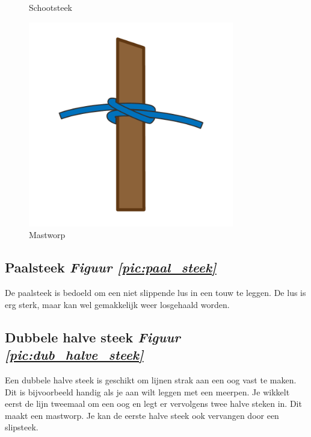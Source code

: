 \begin{figure}[h]
\begin{minipage}[b]{0.32\textwidth}
    \caption{Schootsteek}
    \label{pic:schoot_steek}
    \end{minipage}
  \hfill
  \begin{minipage}[b]{0.32\textwidth}
    \centering
    \includegraphics[width=0.8\textwidth]{Hoofdstukken/Schiemannen/pdf/mastworp.pdf}
    \caption{Mastworp}
    \label{pic:mastworp}
  \end{minipage}
\end{figure}
\subsection{Paalsteek \hfill \textit{Figuur \ref{pic:paal_steek}}} 
De paalsteek is bedoeld om een niet slippende lus in een touw te leggen. De lus is erg sterk, maar kan wel gemakkelijk weer losgehaald worden.
\subsection{Dubbele halve steek \hfill \textit{Figuur \ref{pic:dub_halve_steek}}}
Een dubbele halve steek is geschikt om lijnen strak aan een oog vast te maken. Dit is bijvoorbeeld handig als je aan wilt leggen met een meerpen. Je wikkelt eerst de lijn tweemaal om een oog en legt er vervolgens twee halve steken in. Dit maakt een mastworp. Je kan de eerste halve steek ook vervangen door een slipsteek.
